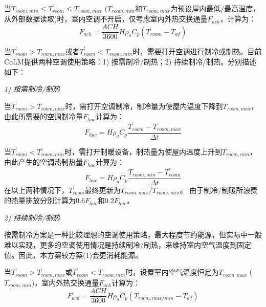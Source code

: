 当$T_{room,min}\leqslant T_{room}^\prime \leqslant T_{room,max} $ ($T_{room,min}$和$T_{room,max}$为预设屋内最低/最高温度，从外部数据读取)时，室内空调不开启，仅考虑室内外热交换通量$F_{ach}$，计算为：
\begin{equation}
F_{a c h}=\frac{ACH}{3600} H \rho_{a} C_{p}\left(T_{{room }}^{\prime}-T_{a f}\right)
\end{equation}

当$T_{room}^\prime>T_{room,max}$或者$T_{room}^\prime<T_{room,min}$时，需要打开空调进行制冷或制热。目前CoLM提供两种空调使用策略：1) 按需制冷/制热；2) 持续制冷/制热。分别描述如下：

\textit{1) 按需制冷/制热}

当$T_{room}^\prime>T_{room,max}$时，需打开空调制冷，制冷量为使屋内温度下降到$T_{room,max}$，由此所需要的空调制冷量$F_{hac}$计算为：
\begin{equation}
F_{{hac }}=H \rho_{a} C_{p} \frac{T_{{room }}^{\prime}-T_{{room,max }}}{\Delta t}
\end{equation}

当$T_{room}^\prime<T_{room,min}$时，需打开制暖设备，制热量为使屋内温度上升到$T_{room,min}$，由此产生的空调热制热量$F_{hac}$计算为：
\begin{equation}
F_{h a c}=H \rho_{a} C_{p} \frac{T_{{room,min }} -T_{{room }}^{\prime}}{\Delta t}
\end{equation}
在以上两种情况下，$T_{room}^\prime$最终更新为$T_{room,max}/T_{room,min}$。
由于制冷/制暖所浪费的热量排放分别计算为$0.6F_{hac}$和$0.2F_{hac}$。

\textit{2) 持续制冷/制热}

按需制冷方案是一种比较理想的空调使用策略，最大程度节约能源，但实际中一般难以实现，更多的空调使用情况是持续制冷/制热，来维持室内空气温度到固定值。因此，本方案较方案(1)会更消耗能源。

当$T_{room}^\prime>T_{room,max}$或$T_{room}^\prime<T_{room,min}$时，设置室内空气温度恒定为$T_{room,max}$ \allowbreak($T_{room,min}$)，室内外热交换通量$F_{ach}$计算为：
\begin{equation}
F_{a c h}=\frac{ACH}{3600} H \rho_{a} C_{p}\left(T_{{room,max/min}}-T_{a f}\right)
\end{equation}

